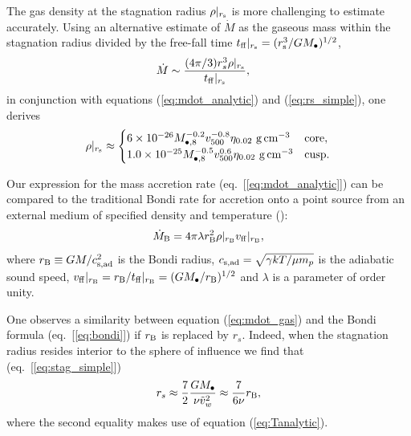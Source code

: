 \documentclass[usenatbib,fleqn]{mn2e}
\newcommand{\rs}{r_s}
\newcommand{\vw}{\tilde{v}_{w}}
\newcommand{\Mbh}[1][]{M_{\bullet#1}}
\newcommand{\Mbheight}{M_{\bullet,8}}
\newcommand{\tff}{t_{\rm ff}}
\newcommand{\densSlope}{\nu}
\begin{document}
The gas density at the stagnation radius $\rho|_{r_{\rm s}}$ is more challenging to estimate accurately.  Using an alternative estimate of $\dot{M}$ as the gaseous mass within the stagnation radius divided by the free-fall time $t_{\rm ff}|_{r_{\rm s}} = (r_{\rm s}^{3}/GM_{\bullet})^{1/2}$,
\begin{align}
  &\dot{M}\sim\frac{(4 \pi/3) \rs^3 \rho|_{r_{\rm s}}}{\tff|_{r_{\rm s}}},
  \label{eq:mdot_gas}
\end{align}
 in conjunction with equations (\ref{eq:mdot_analytic}) and (\ref{eq:rs_simple}), one derives
\begin{align}
  \rho|_{r_{\rm s}}\approx
  \begin{cases}
    6 \times 10^{-26} \Mbheight^{-0.2} v_{500}^{-0.8}  \eta_{0.02} \,
    \, {\rm g \, cm^{-3}}& \text{core},\\
    1.0 \times 10^{-25}  \Mbheight^{-0.5} v_{500}^{0.6}  \eta_{0.02} \,\, {\rm g \,cm^{-3}} & \text{cusp}.
  \end{cases}
  \label{eq:rhors}
\end{align}


Our expression for the mass accretion rate (eq.~[\ref{eq:mdot_analytic}]) can be compared to the traditional Bondi rate for accretion onto a point source from an external medium of specified density and temperature (\citealt{Bondi52}):
\begin{align}
  \dot{M}_{\rm B} =4\pi \lambda r_{\rm B}^2 \rho|_{r_{\rm B}}v_{\rm ff}|_{r_{\rm B}},
\label{eq:bondi}
\end{align}
where $r_{\rm B} \equiv GM/c_{\rm s,ad}^{2}$ is the Bondi radius, $c_{\rm s,ad} = \sqrt{\gamma kT/\mu m_p}$ is the adiabatic sound speed, $v_{\rm ff}|_{r_{\rm B}} = r_{\rm B}/t_{\rm ff}|_{r_{\rm B}} = (GM_{\bullet}/r_{\rm B})^{1/2}$ and $\lambda$ is a parameter of order unity.  

One observes a similarity between equation (\ref{eq:mdot_gas}) and the Bondi formula (eq.~[\ref{eq:bondi}]) if $r_{\rm B}$ is replaced by $\rs$.  Indeed, when the stagnation radius resides interior to the sphere of influence we find that (eq.~[\ref{eq:stag_simple}])
\begin{align}
  \rs\approx\frac{7}{2}\frac{G \Mbh}{\densSlope \vw^2} \approx
  \frac{7}{6 \densSlope}r_{\rm B},
  \label{eq:rs_simple}
\end{align}
where the second equality makes use of equation (\ref{eq:Tanalytic}).  
\end{document}
